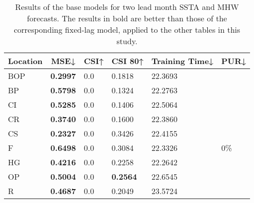\documentclass[11pt, a4paper]{article}
\begin{document}
\begin{table}[H]
\centering
\small
\caption{Results of the base models for two lead month SSTA and MHW forecasts. The results in bold are better than those of the corresponding fixed-lag model, applied to the
other tables in this study.}
\begin{tabular}{llllll}
\multicolumn{1}{c}{\textbf{Location}} & \multicolumn{1}{c}{\textbf{MSE↓}} & \multicolumn{1}{c}{\textbf{CSI↑}} & \multicolumn{1}{c}{\textbf{CSI 80↑}} & \multicolumn{1}{c}{\textbf{Training Time↓}} & \multicolumn{1}{c}{\textbf{PUR↓}} \\ \hline
BOP                         & \textbf{0.2997}                   & 0.0                               & 0.1818                               & 22.3693                            &                          \\
BP                        & \textbf{0.5798}                   & 0.0                               & 0.1324                               & 22.2763                            &                          \\
CI                        & \textbf{0.5285}                   & 0.0                               & 0.1406                               & 22.5064                            &                          \\
CR                           & \textbf{0.3740}                   & 0.0                               & 0.1600                               & 22.3860                            &                          \\
CS                           & \textbf{0.2327}                   & 0.0                               & 0.3426                               & 22.4155                            &                          \\
F                             & \textbf{0.6498}                   & 0.0                               & 0.3084                               & 22.3326                            & 0\%                      \\
HG                          & \textbf{0.4216}                   & 0.0                               & 0.2258                               & 22.2642                            &                          \\
OP                       & \textbf{0.5004}                   & 0.0                               & \textbf{0.2564}                      & 22.6545                            &                          \\
R                                & \textbf{0.4687}                   & 0.0                               & 0.2049                               & 23.5724                            &                          \\

\end{tabular}
\end{table}
\end{document}
